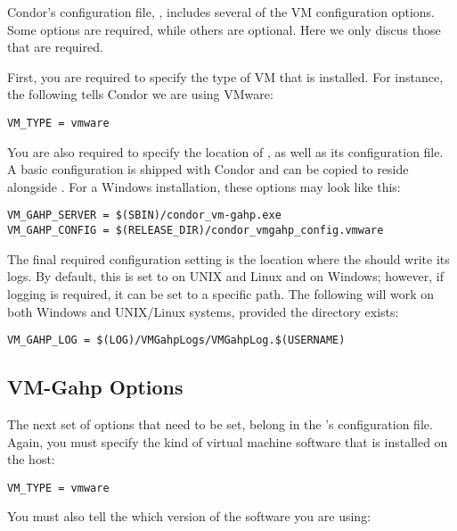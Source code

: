 Condor's configuration file, , includes several of the 
VM configuration options.  Some options are required, while others are 
optional.  Here we only discus those that are required.

First, you are required to specify the type of VM that is installed. 
For instance, the following tells Condor we are using VMware:

\begin{verbatim}
VM_TYPE = vmware
\end{verbatim}

You are also required to specify the location of , as well as 
its configuration file. A basic  configuration is shipped 
with Condor and can be copied to reside alongside . For a 
Windows installation, these options may look like this:

\begin{verbatim}
VM_GAHP_SERVER = $(SBIN)/condor_vm-gahp.exe
VM_GAHP_CONFIG = $(RELEASE_DIR)/condor_vmgahp_config.vmware
\end{verbatim}

The final required configuration setting is the location where the
 should write its logs. By default, this is set to 
 on UNIX and Linux and  on Windows; however, if 
logging is required, it can be set to a specific path.  The following will 
work on both Windows and UNIX/Linux systems, provided the 
 directory exists:

\begin{verbatim}
VM_GAHP_LOG = $(LOG)/VMGahpLogs/VMGahpLog.$(USERNAME)
\end{verbatim}

\subsection{VM-Gahp Options}

The next set of options that need to be set, belong in the 's 
configuration file.  Again, you must specify the kind of virtual machine 
software that is installed on the host:

\begin{verbatim}
VM_TYPE = vmware
\end{verbatim}

You must also tell the  which version of the software you 
are using:

